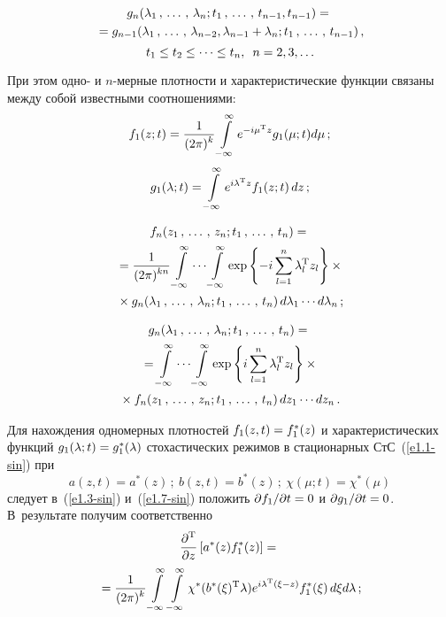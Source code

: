 \begin{multicols}{2}
\vspace*{-12pt}

\noindent
\begin{multline*}
g_n (\la_1\tr \la_n; t_1\tr t_{n-1},t_{n-1})= {}\\
{}=
g_{n-1} (\la_1\tr \la_{n-2},\la_{n-1}+\la_n; t_1\tr t_{n-1})\,, %
\end{multline*}
 $$
        t_1\le t_2 \le \cdots \le t_n,\enskip n=2,3,\ldots
        $$

При этом одно- и $n$-мер\-ные плотности и характеристические функции связаны 
между собой известными соотношениями:
\begin{equation*}
f_1(z;t) = \fr{1}{(2\pi)^{k}} \iin e^{-i\mu^{\mathrm{T}} z} g_1(\mu;t) d\mu\,; %
    \end{equation*}
      \begin{equation*}
   g_1(\la;t) = \iin e^{i\la^{\mathrm{T}} z} f_1(z;t)\, dz\,; %
   \end{equation*}
   
   \vspace*{-12pt}

\noindent
\begin{multline}
f_n( z_1\,,\,\ldots\,,\, z_n; t_1\,,\,\ldots\,,\, t_n) ={}\\
{}=
\displaystyle\frac{\displaystyle 1\mathstrut}{\displaystyle (2\pi)^{kn}\mathstrut} 
\int\limits_{-\infty}^\infty\cdots \int\limits_{-\infty}^\infty \exp \left\{ - i \sum\limits_{l=1}^n \lambda_l^{\mathrm{T}} z_l\right\} \times{}\\
{}\times g_n (\lambda_1\,,\,\ldots\,,\, \lambda_n; t_1\,,\,\ldots\,,\, t_n)\, d\lambda_1\cdots d\lambda_n\,;\label{e1.13-sin}
\end{multline}


\vspace*{-12pt}

\noindent
\begin{multline*}
g_n (\la_1\tr \la_n; t_1\tr t_n) ={}\\
{}=\iin\cdots \iin \exp\lf i \sss_{l=1}^n \la_l^{\mathrm{T}} z_l\rf \times{}\\
{}\times f_n (z_1\tr z_n; t_1\tr t_n)\, dz_1\cdots dz_n\,. %
\end{multline*}

Для нахождения одномерных плотностей $f_1(z,t) \hm= f_1^* (z)$ и характеристических функций 
$g_1(\la;t) \hm= g_1^* (\la)$ стохастических режимов в стационарных СтС~(\ref{e1.1-sin}) при
    \begin{equation}
    a(z,t) = a^*(z)\,;\ b(z,t)=b^*(z)\,;\ \chi(\mu;t)= \chi^*(\mu)
    \label{e1.15-sin}
    \end{equation}
следует в~(\ref{e1.3-sin}) и~(\ref{e1.7-sin}) положить 
$\prt f_1/\prt t \hm= 0$ и $\prt g_1/ \prt t \hm=0$. В~результате получим соответственно
\begin{multline*}
\displaystyle\frac{\displaystyle \partial^{\mathrm{T}}\mathstrut}{\displaystyle \partial z\mathstrut}\left[ a^* (z) f_1^* (z)\right] = {}\\
{}=
\displaystyle\frac{\displaystyle 1\mathstrut}{\displaystyle (2\pi)^k\mathstrut} \int\limits_{-\infty}^\infty \int\limits_{-\infty}^\infty \chi^* (b^*(\xi)^{\mathrm{T}} \lambda) e^{i\lambda^{\mathrm{T}}(\xi-z)} f_1^* (\xi)\, d\xi d\lambda\,;
\end{multline*}


\end{multicols}
